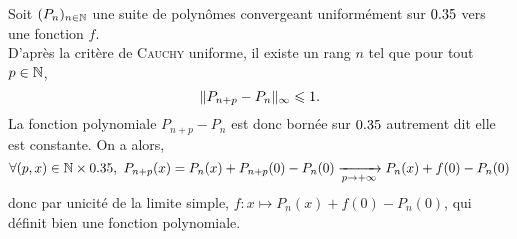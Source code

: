 \begin{preuve}
    Soit $(P_n)_{n \in \mathbb{N}}$ une suite de polynômes convergeant uniformément sur $0.35$ vers une fonction $f$. \\
    D'après la critère de \textsc{Cauchy} uniforme, il existe un rang $n$ tel que pour tout $p \in \mathbb{N}$, 
    $$\Vert P_{n+p} - P_n \Vert_\infty \leqslant 1.$$
    La fonction polynomiale $P_{n+p} - P_n$ est donc bornée sur $0.35$ autrement dit elle est constante. On a alors,
    $$\forall (p, x) \in \mathbb{N} \times 0.35,\ P_{n+p}(x) = P_n(x) + P_{n+p}(0) - P_n(0) \xrightarrow[p \to + \infty]{} P_n(x) + f(0) - P_n(0)$$
    donc par unicité de la limite simple, $f : x \mapsto P_n(x) + f(0) - P_n(0)$, qui définit bien une fonction polynomiale. 
\end{preuve}